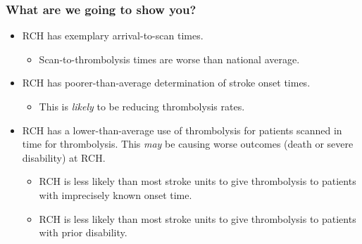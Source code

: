 \begin{frame}
\frametitle{What are we going to show you?}

\begin{itemize} 

\setlength{\itemsep}{5mm}

    \item RCH has exemplary arrival-to-scan times.

        \begin{itemize}

        \vspace{2mm}

        \setlength{\itemsep}{2mm}
            
            \item Scan-to-thrombolysis times are worse than national average.
                
        
    \end{itemize}
    

    \item RCH has poorer-than-average determination of stroke onset times. 
    
    \begin{itemize}

        \vspace{2mm}
        
        \item This is \textit{likely} to be reducing thrombolysis rates.

    \end{itemize}

    \item RCH has a lower-than-average use of thrombolysis for patients scanned in time for thrombolysis. This \textit{may} be causing worse outcomes (death or severe disability) at RCH.

    \begin{itemize}

        \vspace{2mm}

        \setlength{\itemsep}{2mm}
            
        \item RCH is less likely than most stroke units to give thrombolysis to patients with imprecisely known onset time.

        \item RCH is less likely than most stroke units to give thrombolysis to patients with prior disability.
        
    \end{itemize}

    
\end{itemize}


\end{frame}